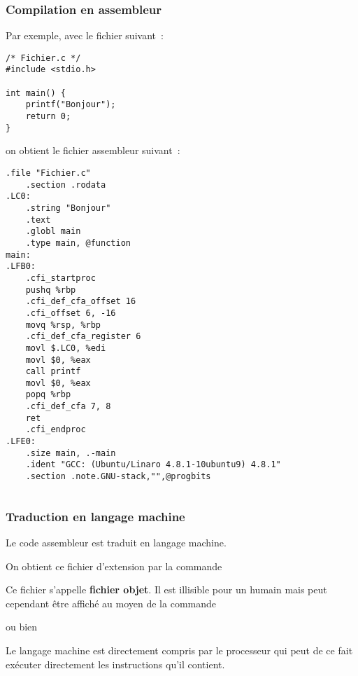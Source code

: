 \begin{frame}[fragile]
\frametitle{Compilation en assembleur}
Par exemple, avec le fichier  suivant~:

\begin{minipage}[c]{.4\textwidth}
\begin{lstlisting}[frame=single,numbers=none,basicstyle=\ttfamily\scriptsize]
/* Fichier.c */
#include <stdio.h>

int main() {
    printf("Bonjour");
    return 0;
}
\end{lstlisting}
\end{minipage}

on obtient le fichier assembleur  suivant~:
\begin{multicols}{3}
\begin{lstlisting}[language={[x86masm]Assembler},numbers=none,
    basicstyle=\ttfamily\scriptsize]
    .file "Fichier.c"
    .section .rodata
.LC0:
    .string	"Bonjour"
    .text
    .globl main
    .type main, @function
main:
.LFB0:
    .cfi_startproc
    pushq %rbp
    .cfi_def_cfa_offset 16
    .cfi_offset 6, -16
    movq %rsp, %rbp
    .cfi_def_cfa_register 6
    movl $.LC0, %edi
    movl $0, %eax
    call printf
    movl $0, %eax
    popq %rbp
    .cfi_def_cfa 7, 8
    ret
    .cfi_endproc
.LFE0:
    .size main, .-main
    .ident "GCC: (Ubuntu/Linaro 4.8.1-10ubuntu9) 4.8.1"
    .section .note.GNU-stack,"",@progbits

\end{lstlisting}
\end{multicols}
\begin{math} \end{math}
\end{frame}

\begin{frame}[fragile]
\frametitle{Traduction en langage machine}
Le code assembleur  est traduit en \alert{langage machine}.
\medskip

On obtient ce fichier d'extension  par la commande
\begin{center}\end{center}
\bigskip

Ce fichier s'appelle {\bf fichier objet}. Il est illisible pour un humain
mais peut cependant être affiché au moyen de la commande
\begin{center} ou bien  \end{center}
\medskip

Le langage machine est directement compris par le processeur qui peut
de ce fait exécuter directement les instructions qu'il contient.
\end{frame}

